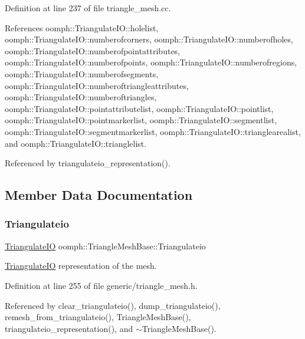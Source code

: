 Definition at line 237 of file triangle\+\_\+mesh.\+cc.



References oomph\+::\+Triangulate\+I\+O\+::holelist, oomph\+::\+Triangulate\+I\+O\+::numberofcorners, oomph\+::\+Triangulate\+I\+O\+::numberofholes, oomph\+::\+Triangulate\+I\+O\+::numberofpointattributes, oomph\+::\+Triangulate\+I\+O\+::numberofpoints, oomph\+::\+Triangulate\+I\+O\+::numberofregions, oomph\+::\+Triangulate\+I\+O\+::numberofsegments, oomph\+::\+Triangulate\+I\+O\+::numberoftriangleattributes, oomph\+::\+Triangulate\+I\+O\+::numberoftriangles, oomph\+::\+Triangulate\+I\+O\+::pointattributelist, oomph\+::\+Triangulate\+I\+O\+::pointlist, oomph\+::\+Triangulate\+I\+O\+::pointmarkerlist, oomph\+::\+Triangulate\+I\+O\+::segmentlist, oomph\+::\+Triangulate\+I\+O\+::segmentmarkerlist, oomph\+::\+Triangulate\+I\+O\+::trianglearealist, and oomph\+::\+Triangulate\+I\+O\+::trianglelist.



Referenced by triangulateio\+\_\+representation().



\subsection{Member Data Documentation}
\mbox{\label{classoomph_1_1TriangleMeshBase_a488453de96eadbe320ea97c63a34d748}} 
\subsubsection{\texorpdfstring{Triangulateio}{Triangulateio}}
{\footnotesize\ttfamily \hyperlink{structoomph_1_1TriangulateIO}{Triangulate\+IO} oomph\+::\+Triangle\+Mesh\+Base\+::\+Triangulateio\hspace{0.3cm}{\ttfamily [protected]}}



\hyperlink{structoomph_1_1TriangulateIO}{Triangulate\+IO} representation of the mesh. 



Definition at line 255 of file generic/triangle\+\_\+mesh.\+h.



Referenced by clear\+\_\+triangulateio(), dump\+\_\+triangulateio(), remesh\+\_\+from\+\_\+triangulateio(), Triangle\+Mesh\+Base(), triangulateio\+\_\+representation(), and $\sim$\+Triangle\+Mesh\+Base().


